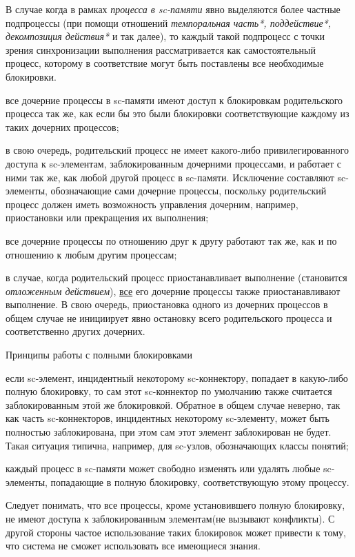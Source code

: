         \begin{textitemize}
        \item В случае когда в рамках \textit{процесса в sc-памяти} явно выделяются более частные подпроцессы (при помощи отношений \textit{темпоральная часть*, поддействие*, декомпозиция действия*} и так далее), то каждый такой подпроцесс с точки зрения синхронизации выполнения рассматривается как самостоятельный процесс, которому в соответствие могут быть поставлены все необходимые блокировки.
	    \item все дочерние процессы в sc-памяти имеют доступ к блокировкам родительского процесса так же, как если бы это были блокировки соответствующие каждому из таких дочерних процессов;
		\item в свою очередь, родительский процесс не имеет какого-либо привилегированного доступа к sc-элементам, заблокированным дочерними процессами, и работает с ними так же, как любой другой процесс в sc-памяти. Исключение составляют sc-элементы, обозначающие сами дочерние процессы, поскольку родительский процесс должен иметь возможность управления дочерним, например, приостановки или прекращения их выполнения;
		\item все дочерние процессы по отношению друг к другу работают так же, как и по отношению к любым другим процессам;
		\newpage 
        \item в случае, когда родительский процесс приостанавливает выполнение (становится \textit{отложенным действием}), \uline{все} его дочерние процессы также приостанавливают выполнение. В свою очередь, приостановка одного из дочерних процессов в общем случае не инициирует явно остановку всего родительского процесса и соответственно других дочерних.
		\end{textitemize}
\begin{frame}{\large Принципы работы с полными блокировками}
    \vspace{18}
    \begin{textitemize}
	\item если sc-элемент, инцидентный некоторому sc-коннектору, попадает в какую-либо полную блокировку, то сам этот sc-коннектор по умолчанию также считается заблокированным этой же блокировкой. Обратное в общем случае неверно, так как часть sc-коннекторов, инцидентных некоторому sc-элементу, может быть полностью заблокирована, при этом сам этот элемент заблокирован не будет. Такая ситуация типична, например, для sc-узлов, обозначающих классы понятий;
	\item каждый процесс в sc-памяти может свободно изменять или удалять любые sc-элементы, попадающие в полную блокировку, соответствующую этому процессу.
\end{textitemize}
Следует понимать, что все процессы, кроме установившего полную блокировку, не имеют доступа к заблокированным элементам(не вызывают конфликты). С другой стороны частое использование таких блокировок может привести к тому, что система не сможет использовать все имеющиеся знания.
\end{frame}

